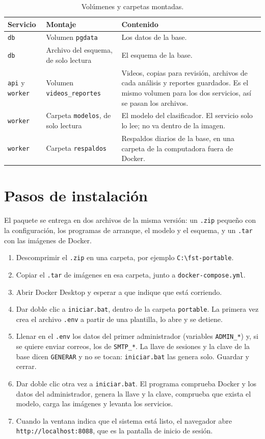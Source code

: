 \begin{table}[H]
\centering
\caption{Volúmenes y carpetas montadas.}
\label{tab:ap_volumenes}
\begin{tabular}{|p{2.2cm}|p{4.4cm}|p{7.2cm}|}
\hline
\textbf{Servicio} & \textbf{Montaje} & \textbf{Contenido} \\
\hline
\texttt{db} & Volumen \texttt{pgdata} & Los datos de la base. \\
\hline
\texttt{db} & Archivo del esquema, de solo lectura & El esquema de la base. \\
\hline
\texttt{api} y \texttt{worker} & Volumen \texttt{videos\_reportes} & Videos, copias
para revisión, archivos de cada análisis y reportes guardados. Es el mismo volumen
para los dos servicios, así se pasan los archivos. \\
\hline
\texttt{worker} & Carpeta \texttt{modelos}, de solo lectura & El modelo del
clasificador. El servicio solo lo lee; no va dentro de la imagen. \\
\hline
\texttt{worker} & Carpeta \texttt{respaldos} & Respaldos diarios de la base, en una
carpeta de la computadora fuera de Docker. \\
\hline
\end{tabular}
\end{table}

\section{Pasos de instalación}

El paquete se entrega en dos archivos de la misma versión: un \texttt{.zip} pequeño
con la configuración, los programas de arranque, el modelo y el esquema, y un
\texttt{.tar} con las imágenes de Docker.

\begin{enumerate}
\item Descomprimir el \texttt{.zip} en una carpeta, por ejemplo \texttt{C:\textbackslash fst-portable}.
\item Copiar el \texttt{.tar} de imágenes en esa carpeta, junto a \texttt{docker-compose.yml}.
\item Abrir Docker Desktop y esperar a que indique que está corriendo.
\item Dar doble clic a \texttt{iniciar.bat}, dentro de la carpeta \texttt{portable}.
La primera vez crea el archivo \texttt{.env} a partir de una plantilla, lo abre y se
detiene.
\item Llenar en el \texttt{.env} los datos del primer administrador (variables
\texttt{ADMIN\_*}) y, si se quiere enviar correos, los de \texttt{SMTP\_*}. La llave de
sesiones y la clave de la base dicen \texttt{GENERAR} y no se tocan: \texttt{iniciar.bat}
las genera solo. Guardar y cerrar.
\item Dar doble clic otra vez a \texttt{iniciar.bat}. El programa comprueba Docker y los
datos del administrador, genera la llave y la clave, comprueba que exista el modelo,
carga las imágenes y levanta los servicios.
\item Cuando la ventana indica que el sistema está listo, el navegador abre
\texttt{http://localhost:8088}, que es la pantalla de inicio de sesión.
\end{enumerate}

